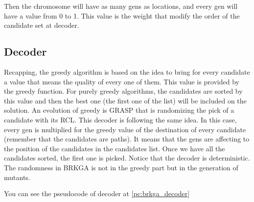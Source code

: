 \documentclass[]{report}
\begin{document}
Then the chromosome will have as many gens as locations, and every gen will have a value from 0 to 1. This value is the weight that modify the order of the candidate set at decoder.

\subsection{Decoder}\label{ss:brkga_decoder}

Recapping, the greedy algorithm is based on the idea to bring for every candidate a value that means the quality of every one of them. This value is provided by the greedy function. For purely greedy algorithms, the candidates are sorted by this value and then the best one (the first one of the list) will be included on the solution. An evolution of greedy is GRASP that is randomizing the pick of a candidate with its RCL. This decoder is following the same idea. In this case, every gen is multiplied for the greedy value of the destination of every candidate (remember that the candidates are paths). It means that the gens are affecting to the position of the candidates in the candidates list. Once we have all the candidates sorted, the first one is picked. Notice that the decoder is deterministic. The randomness in BRKGA is not in the greedy part but in the generation of mutants.

You can see the pseudocode of decoder at \ref{pc:brkga_decoder}
\end{document}
